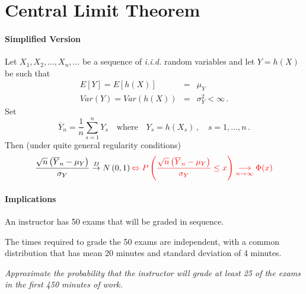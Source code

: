 \documentclass[notes=show,smaller]{beamer}\usepackage[]{graphicx}\usepackage[]{color}
\begin{document}
\section{Central Limit Theorem}

\begin{frame}{\secname}
  \framesubtitle{Simplified Version}
\begin{theorem} Let $X_{1},X_{2},...,X_{n},...$ be a sequence of \textit{i.i.d.} random variables and let $Y=h(X)$ be such that
  \begin{eqnarray*}
  E[Y]=E\left[ h(X)\right]  &=&\mu_Y  \\
  Var(Y)=Var\left( h(X)\right)  &=&\sigma_Y ^{2}<\infty\,.
  \end{eqnarray*}%
  Set
  $$
  \overline{Y}_n=\frac{1}{n}\sum_{s=1}^nY_s\quad\text{where}\quad Y_s=h(X_s)\,,\quad s=1,\ldots,n\,.
  $$
  Then (under quite general regularity conditions)%
  \begin{equation*}
  \frac{\sqrt{n}\left( \overline{Y}_{n}-\mu_Y \right) }{\sigma_Y }\overset{D}{%
  \rightarrow }N\left( 0,1\right)
  {\color{red}
  \Leftrightarrow
  P\left(\frac{\sqrt{n}\left( \overline{Y}_{n}-\mu_Y \right) }{\sigma_Y} \leq x \right)
  \underset{n\rightarrow \infty}{\longrightarrow} \Phi(x)}
  \end{equation*}
  \end{theorem}
\end{frame}



\begin{frame}{\secname}
\framesubtitle{Implications}
\end{frame}

\begin{frame}{\secname}
  \begin{example}
  \begin{footnotesize}
  An instructor has 50 exams that will be graded in sequence.

  \medskip

  The times required to grade the 50 exams are independent, with a common distribution that has mean 20 minutes and standard deviation of 4 minutes.

  \medskip

  \emph{Approximate the probability that the instructor will grade at least 25 of the exams in the first 450 minutes of work.}
  \end{footnotesize}
  \end{example}
\end{frame}

\begin{frame}{\secname}
  \begin{example}
  \begin{footnotesize}

\vspace{7cm}

  \end{footnotesize}
  \end{example}
\end{frame}
\end{document}
